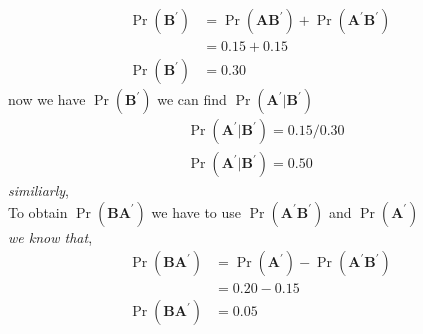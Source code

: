 \documentclass[journal,12pt,twocolumn]{IEEEtran}
\providecommand{\pr}[1]{\ensuremath{\Pr\left(#1\right)}}
\theoremstyle{remark}
\begin{document}
\begin{align}
 \pr{\textbf{B}^ \prime}&= \pr{\textbf{A} \textbf{B} ^\prime} + \pr{\textbf{A} ^\prime  \textbf{B} ^\prime}
\\             &=0.15 +0.15
\\ \pr{\textbf{B} ^\prime} &=0.30
\end{align}
now we have \pr{\textbf{B} ^\prime} we can find \pr{\textbf{A} ^\prime|\textbf{B} ^\prime}
\begin{align}
 &\pr{\textbf{A}^\prime|\textbf{B} ^\prime}= 0.15/0.30
\\ &\pr{\textbf{A} ^\prime|\textbf{B} ^\prime} = 0.50
\end{align}
\textit{similiarly},
\\ To obtain \pr{\textbf{B} \textbf{A} ^\prime} we have to use \pr{\textbf{A} ^\prime  \textbf{B} ^\prime} and \pr{\textbf{A}^\prime}
\\ \textit{we know that},
\begin{align}
 \pr{\textbf{B}  \textbf{A} ^\prime}&=\pr{\textbf{A}^\prime}-\pr{\textbf{A} ^\prime \textbf{B} ^\prime}
\\ &= 0.20-0.15
\\ \pr{\textbf{B}  \textbf{A}^\prime} &= 0.05
\end{align}
\end{document}
